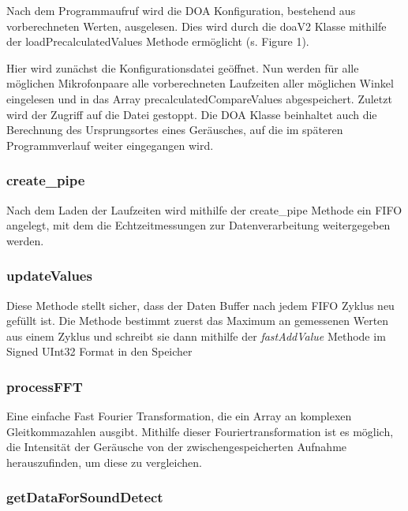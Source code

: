 Nach dem Programmaufruf wird die DOA Konfiguration, bestehend aus vorberechneten Werten, ausgelesen. Dies wird durch die doaV2 Klasse mithilfe der loadPrecalculatedValues Methode ermöglicht (s. Figure 1).

Hier wird zunächst die Konfigurationsdatei geöffnet. Nun werden für alle möglichen Mikrofonpaare alle vorberechneten Laufzeiten aller möglichen Winkel eingelesen und in das Array precalculatedCompareValues abgespeichert. Zuletzt wird der Zugriff auf die Datei gestoppt. Die DOA Klasse beinhaltet auch die Berechnung des Ursprungsortes eines Geräusches, auf die im späteren Programmverlauf weiter eingegangen wird.



\subsubsection{create\_pipe}

Nach dem Laden der Laufzeiten wird mithilfe der create\_pipe Methode ein FIFO angelegt, mit dem die Echtzeitmessungen zur Datenverarbeitung weitergegeben werden.

\subsubsection{updateValues}

Diese Methode stellt sicher, dass der Daten Buffer nach jedem FIFO Zyklus neu gefüllt ist. Die Methode bestimmt zuerst das Maximum an gemessenen Werten aus einem Zyklus und schreibt sie dann mithilfe der \textit{fastAddValue} Methode im Signed UInt32 Format in den Speicher

\subsubsection{processFFT}

Eine einfache \glqq Fast Fourier Transformation\grqq, die ein Array an komplexen Gleitkommazahlen ausgibt. Mithilfe dieser Fouriertransformation ist es möglich, die Intensität der Geräusche von der zwischengespeicherten Aufnahme herauszufinden, um diese zu vergleichen.


\subsubsection{getDataForSoundDetect}

